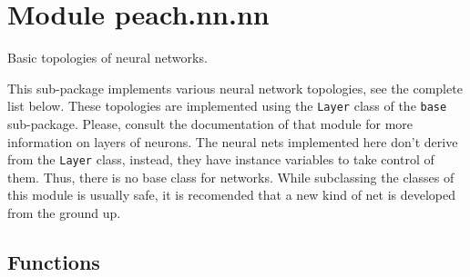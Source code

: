 %
%
%


\section{Module peach.nn.nn}

    \label{peach:nn:nn}

Basic topologies of neural networks.

This sub-package implements various neural network topologies, see the complete
list below. These topologies are implemented using the \texttt{Layer} class of the
\texttt{base} sub-package. Please, consult the documentation of that module for more
information on layers of neurons. The neural nets implemented here don't derive
from the \texttt{Layer} class, instead, they have instance variables to take control
of them. Thus, there is no base class for networks. While subclassing the
classes of this module is usually safe, it is recomended that a new kind of
net is developed from the ground up.


  \subsection{Functions}

    \label{peach:nn:nn:randn}

    \vspace{0.5ex}

